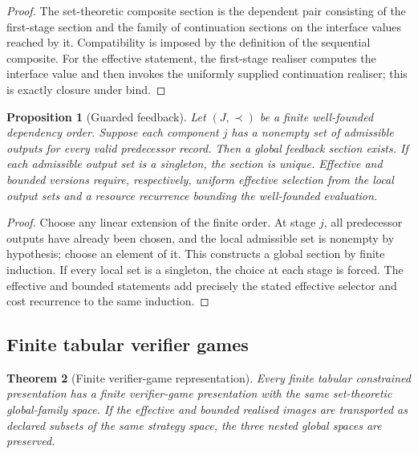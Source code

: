\documentclass[11pt]{article}
\theoremstyle{plain}
\newtheorem{theorem}{Theorem}[section]
\newtheorem{proposition}[theorem]{Proposition}
\theoremstyle{definition}
\theoremstyle{remark}
\begin{document}
\begin{proof}
The set-theoretic composite section is the dependent pair consisting of the
first-stage section and the family of continuation sections on the interface
values reached by it. Compatibility is imposed by the definition of the
sequential composite. For the effective statement, the first-stage realiser
computes the interface value and then invokes the uniformly supplied continuation
realiser; this is exactly closure under bind.
\end{proof}

\begin{proposition}[Guarded feedback]
\label{prop:guarded-feedback-monograph}
Let $(J,\prec)$ be a finite well-founded dependency order. Suppose each component
$j$ has a nonempty set of admissible outputs for every valid predecessor record.
Then a global feedback section exists. If each admissible output set is a
singleton, the section is unique. Effective and bounded versions require,
respectively, uniform effective selection from the local output sets and a
resource recurrence bounding the well-founded evaluation.
\end{proposition}

\begin{proof}
Choose any linear extension of the finite order. At stage $j$, all predecessor
outputs have already been chosen, and the local admissible set is nonempty by
hypothesis; choose an element of it. This constructs a global section by finite
induction. If every local set is a singleton, the choice at each stage is forced.
The effective and bounded statements add precisely the stated effective selector
and cost recurrence to the same induction.
\end{proof}

\subsection{Finite tabular verifier games}

\begin{theorem}[Finite verifier-game representation]
\label{thm:finite-verifier-game-representation}
Every finite tabular constrained presentation has a finite verifier-game
presentation with the same set-theoretic global-family space. If the effective
and bounded realised images are transported as declared subsets of the same
strategy space, the three nested global spaces are preserved.
\end{theorem}
\end{document}
